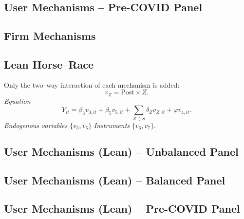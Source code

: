 \documentclass{article}
\newcommand{\cleanedresultsdir}{../../results/cleaned}
\begin{document}
\begin{landscape}
\subsection{User Mechanisms -- Pre-COVID Panel}

\end{landscape}

\clearpage
\begin{landscape}
\subsection{Firm Mechanisms}

\end{landscape}


\clearpage
\subsection*{Lean Horse–Race}
Only the two–way interaction of each mechanism is added:
\[v_Z = \text{Post}\!\times\! Z.\]
\emph{Equation}
\[Y_{it}=\beta_3 v_{3,it}+\beta_5 v_{5,it}+\sum_{Z\in S}\delta_Z v_{Z,it}+\varphi v_{4,it}.
\]
\emph{Endogenous variables}\; $\{v_3,v_5\}$ \quad\emph{Instruments}\; $\{v_6,v_7\}$.


\clearpage
\begin{landscape}
\subsection{User Mechanisms (Lean) -- Unbalanced Panel}

\end{landscape}

\begin{landscape}
\subsection{User Mechanisms (Lean) -- Balanced Panel}

\end{landscape}

\begin{landscape}
\subsection{User Mechanisms (Lean) -- Pre-COVID Panel}

\end{landscape}
\end{document}
